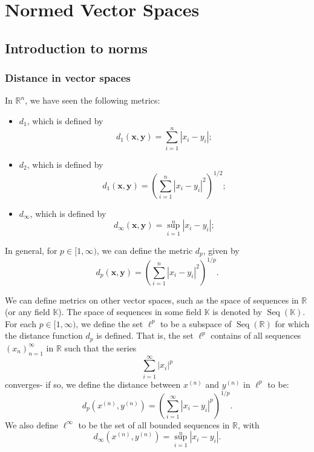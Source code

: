 \documentclass[a4paper, openany]{memoir}
\theoremstyle{definition}
\theoremstyle{plain}
\begin{document}
\chapter{Normed Vector Spaces}
\section{Introduction to norms}
\subsection{Distance in vector spaces}
In $\mathbb{R}^n$, we have seen the following metrics:
\begin{itemize}
    \item $d_1$, which is defined by
    \[d_1(\bm{x}, \bm{y}) = \sum_{i=1}^n |x_i - y_i|;\]
    \item $d_2$, which is defined by
    \[d_1(\bm{x}, \bm{y}) = \left(\sum_{i=1}^n |x_i - y_i|^2\right)^{1/2};\]
    \item $d_\infty$, which is defined by
    \[d_\infty(\bm{x}, \bm{y}) = \sup_{i=1}^n |x_i - y_i|;\]
\end{itemize}
In general, for $p \in [1, \infty)$, we can define the metric $d_p$, given by
\[d_p(\bm{x}, \bm{y}) = \left(\sum_{i=1}^n |x_i - y_i|^2\right)^{1/p}.\]


We can define metrics on other vector spaces, such as the space of sequences in $\mathbb{R}$ (or any field $\mathbb{K}$). The space of sequences in some field $\mathbb{K}$ is denoted by $\operatorname{Seq}(\mathbb{K})$. For each $p \in [1, \infty)$, we define the set $\ell^p$ to be a subspace of $\operatorname{Seq}(\mathbb{R})$ for which the distance function $d_p$ is defined. That is, the set $\ell^p$ contains of all sequences $(x_n)_{n=1}^\infty$ in $\mathbb{R}$ such that the series
\[\sum_{i=1}^\infty |x_i|^p \]
converges- if so, we define the distance between $x^{(n)}$ and $y^{(n)}$ in $\ell^p$ to be:
\[d_p(x^{(n)}, y^{(n)}) = \left(\sum_{i=1}^\infty |x_i - y_i|^p \right)^{1/p}.\]
We also define $\ell^\infty$ to be the set of all bounded sequences in $\mathbb{R}$, with
\[d_\infty(x^{(n)}, y^{(n)}) = \sup_{i=1}^n |x_i - y_i|.\]
\end{document}
